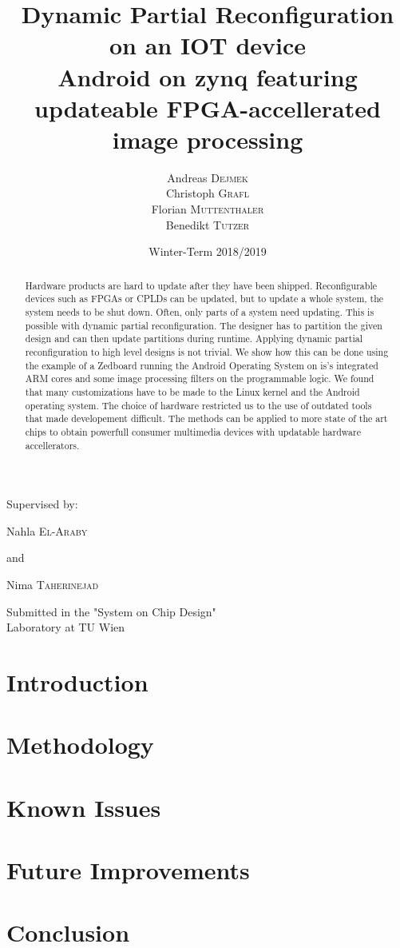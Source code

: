 \documentclass{article}
\title{Dynamic Partial Reconfiguration on an IOT device\\
\vspace{1em}
Android on zynq featuring updateable FPGA-accellerated image processing}
\author{Andreas \textsc{Dejmek}\\ Christoph \textsc{Grafl} \\
	Florian \textsc{Muttenthaler} \\ Benedikt \textsc{Tutzer}}
\date{Winter-Term 2018/2019}
\begin{document}
\maketitle
\begin{center}
	Supervised by:

	Nahla \textsc{El-Araby}

	and

	Nima \textsc{Taherinejad}
\end{center}
\begin{abstract}
	Hardware products are hard to update after they have been shipped.
	Reconfigurable devices such as FPGAs or CPLDs can be updated, but to
	update a whole system, the system needs to be shut down.
	Often, only parts of a system need updating.
	This is possible with dynamic partial reconfiguration.
	The designer has to partition the given design and can then update
	partitions during runtime.
	Applying dynamic partial reconfiguration to high level designs is not
	trivial.
	We show how this can be done using the example of a Zedboard running the
	Android Operating System on is's integrated ARM cores and some image
	processing filters on the programmable logic.
	We found that many customizations have to be made to the Linux kernel
	and the Android operating system.
	The choice of hardware restricted us to the use of outdated tools that
	made developement difficult.
	The methods can be applied to more state of the art chips to obtain
	powerfull consumer multimedia devices with updatable hardware
	accellerators.
\end{abstract}
\begin{center}
	Submitted in the "System on Chip Design"\\Laboratory at TU Wien


\end{center}
\pagebreak
\tableofcontents
\pagebreak
\section{Introduction}\label{sec:introduction}

\section{Methodology}\label{sec:methodology}

\section{Known Issues}\label{sec:knownissues}

\section{Future Improvements}\label{sec:futureimprovements}

\section{Conclusion}\label{sec:conclusion}


\end{document}
